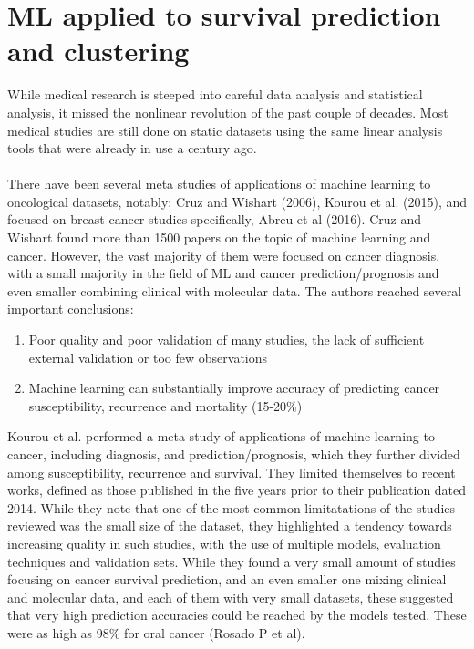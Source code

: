 \documentclass[a4paper]{article}
\begin{document}
\section{ML applied to survival prediction and clustering}
While medical research is steeped into careful data analysis and statistical analysis, it missed the nonlinear revolution of the past couple of decades. Most medical studies are still done on static datasets using the same linear analysis tools that were already in use a century ago. \\
\\
There have been several meta studies of applications of machine learning to oncological datasets, notably: Cruz and Wishart (2006), Kourou et al. (2015), and focused on breast cancer studies specifically, Abreu et al (2016). Cruz and Wishart found more than 1500 papers on the topic of machine learning and cancer. However, the vast majority of them were focused on cancer diagnosis, with a small majority in the field of ML and cancer prediction/prognosis and even smaller combining clinical with molecular data. The authors reached several important conclusions: 
\begin{enumerate}
\item Poor quality and poor validation of many studies, the lack of sufficient external validation or too few observations
\item Machine learning can substantially improve accuracy of predicting cancer susceptibility, recurrence and mortality (15-20\%) 
\end{enumerate}
%
Kourou et al. performed a meta study of applications of machine learning to cancer, including diagnosis, and prediction/prognosis, which they further divided among susceptibility, recurrence and survival. They limited themselves to recent works, defined as those published in the five years prior to their publication dated 2014. While they note that one of the most common limitatations of the studies reviewed was the small size of the dataset, they highlighted a tendency towards increasing quality in such studies, with the use of multiple models, evaluation techniques and validation sets. While they found a very small amount of studies focusing on cancer survival prediction, and an even smaller one mixing clinical and molecular data, and each of them with very small datasets, these suggested that very high prediction accuracies could be reached by the models tested. These were as high as 98\% for oral cancer (Rosado P et al).\\
\\
\end{document}
